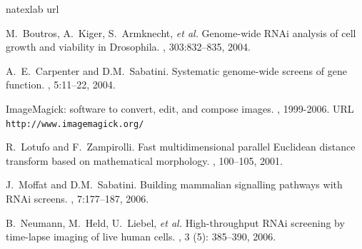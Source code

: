 \begin{thebibliography}{1}
\expandafter\ifx\csname natexlab\endcsname\relax\def\natexlab#1{#1}\fi
\expandafter\ifx\csname url\endcsname\relax
  \def\url#1{{\tt #1}}\fi

  M.~Boutros, A.~Kiger, S.~Armknecht, \textit{et al.}
  \newblock Genome-wide RNAi analysis of cell growth and viability in Drosophila.
  , 303:832--835, 2004.


  A.~E.~Carpenter and D.M.~Sabatini.
  \newblock Systematic genome-wide screens of gene function.
  , 5:11--22, 2004.


    ImageMagick: software to convert, edit, and compose images.
    , 1999-2006.
    \newblock URL \url{http://www.imagemagick.org/}


    R.~Lotufo and F.~Zampirolli.
    \newblock Fast multidimensional parallel Euclidean distance transform based on mathematical morphology.
    , 100--105, 2001.

  J.~Moffat and D.M.~Sabatini.
  \newblock Building mammalian signalling pathways with RNAi screens.
  , 7:177--187, 2006.

    B.~Neumann, M.~Held, U.~Liebel, \textit{et al.}
    \newblock High-throughput RNAi screening by time-lapse imaging of live human cells.
    , 3 (5): 385--390, 2006.


\end{thebibliography}

